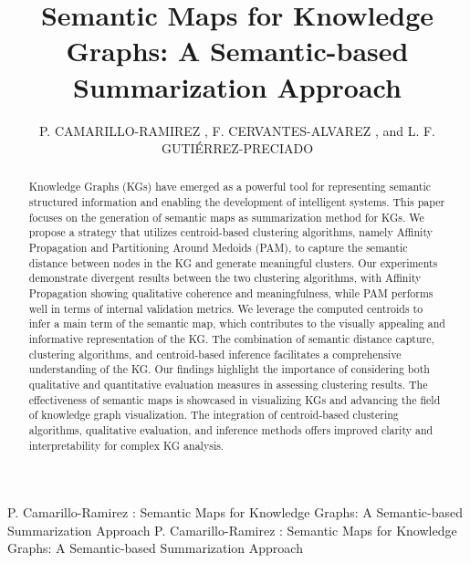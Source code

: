 \documentclass{ieeeaccess}
\begin{document}

\title{Semantic Maps for Knowledge Graphs: A Semantic-based Summarization Approach}
\author{
\uppercase{P. Camarillo-Ramirez} ,
\uppercase{F. Cervantes-Alvarez} , and
\uppercase{L. F. Guti\'{e}rrez-Preciado}}
\address[1]{Western Institute of Technology and Higher Education, Guadalajara, 45601 Mexico (pablo.camarillo@iteso.mx;fcervantes@iteso.mx;lgutierrez@iteso.mx;)}


\markboth
{P. Camarillo-Ramirez \headeretal: Semantic Maps for Knowledge Graphs: A Semantic-based Summarization Approach}
{P. Camarillo-Ramirez \headeretal: Semantic Maps for Knowledge Graphs: A Semantic-based Summarization Approach}


\graphicspath{ {img/} }

\begin{abstract}
Knowledge Graphs (KGs) have emerged as a powerful
tool for representing semantic structured information
and enabling the development of intelligent systems.
This paper focuses on the generation of semantic maps 
as summarization method for KGs. We propose
a strategy that utilizes centroid-based clustering 
algorithms, namely Affinity Propagation and Partitioning
Around Medoids (PAM), to capture the semantic distance 
between nodes in the KG and generate meaningful 
clusters. Our experiments demonstrate divergent results 
between the two clustering algorithms, with Affinity
Propagation showing qualitative coherence and 
meaningfulness, while PAM performs well in terms of
internal validation metrics. We leverage the computed 
centroids to infer a main term of the semantic map, which contributes to the visually appealing and informative
representation of the KG. The combination of semantic 
distance capture, clustering algorithms, and centroid-based
inference facilitates a comprehensive understanding of the KG. Our findings highlight the importance of considering
both qualitative and quantitative evaluation measures in 
assessing clustering results. The effectiveness of semantic 
maps is showcased in visualizing KGs and advancing the
field of knowledge graph visualization. The integration of
centroid-based clustering algorithms, qualitative evaluation,
and inference methods offers improved clarity and 
interpretability for complex KG analysis.
\end{abstract}
\end{document}
